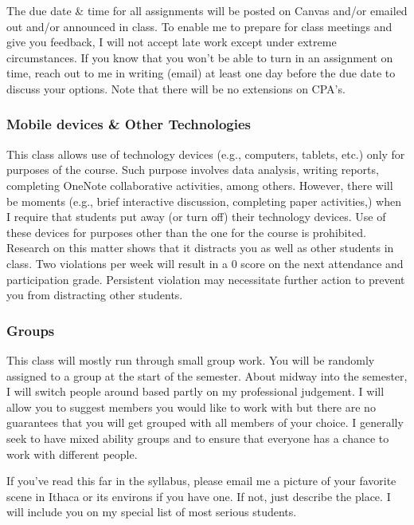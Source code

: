 \documentclass[
  letterpaper,
  DIV=11,
  numbers=noendperiod]{scrartcl}
\begin{document}
The due date \& time for all assignments will be posted on Canvas and/or
emailed out and/or announced in class. To enable me to prepare for class
meetings and give you feedback, {I will not accept late work} except
under extreme circumstances. If you know that you won't be able to turn
in an assignment on time, reach out to me in writing (email) at least
one day before the due date to discuss your options. Note that there
will be {no extensions on CPA's}.

\subsubsection{Mobile devices \& Other
Technologies}\label{mobile-devices-other-technologies}

This class allows use of technology devices (e.g., computers, tablets,
etc.) only for purposes of the course. Such purpose involves data
analysis, writing reports, completing OneNote collaborative activities,
among others. However, there will be moments (e.g., brief interactive
discussion, completing paper activities,) when I require that students
put away (or turn off) their technology devices. Use of these devices
for purposes other than the one for the course is prohibited. Research
on this matter shows that it distracts you as well as other students in
class. Two violations per week will result in a 0 score on the next
attendance and participation grade. Persistent violation may necessitate
further action to prevent you from distracting other students.

\subsubsection{Groups}\label{groups}

This class will mostly run through small group work. You will be
randomly assigned to a group at the start of the semester. About midway
into the semester, I will switch people around based partly on my
professional judgement. I will allow you to suggest members you would
like to work with but there are no guarantees that you will get grouped
with all members of your choice. I generally seek to have mixed ability
groups and to ensure that everyone has a chance to work with different
people.

\begin{tcolorbox}[enhanced jigsaw, colframe=quarto-callout-note-color-frame, rightrule=.15mm, leftrule=.75mm, coltitle=black, colback=white, title=\textcolor{quarto-callout-note-color}{\faInfo}\hspace{0.5em}{Click here for syllabus bounty!}, left=2mm, colbacktitle=quarto-callout-note-color!10!white, opacitybacktitle=0.6, toprule=.15mm, arc=.35mm, bottomrule=.15mm, titlerule=0mm, toptitle=1mm, breakable, bottomtitle=1mm, opacityback=0]

If you've read this far in the syllabus, please email me a picture of
your favorite scene in Ithaca or its environs if you have one. If not,
just describe the place. I will include you on my special list of most
serious students.

\end{tcolorbox}
\end{document}
